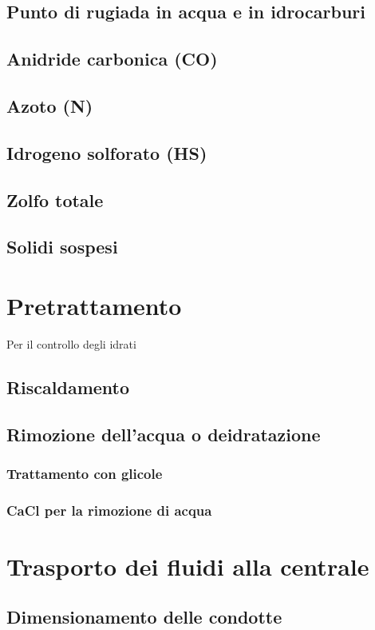 \subsection{Punto di rugiada in acqua e in idrocarburi}
\subsection{Anidride carbonica (CO)}
\subsection{Azoto (N)}
\subsection{Idrogeno solforato (HS)}
\subsection{Zolfo totale}
\subsection{Solidi sospesi}

\section{Pretrattamento}
Per il controllo degli idrati
\subsection{Riscaldamento}
\subsection{Rimozione dell'acqua o deidratazione}
\subsubsection{Trattamento con glicole}
\subsubsection{CaCl per la rimozione di acqua}

\section{Trasporto dei fluidi alla centrale}
\subsection{Dimensionamento delle condotte}

